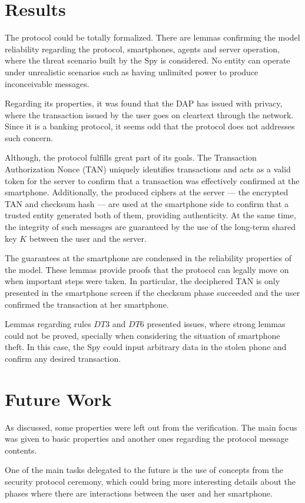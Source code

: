 \section{Results}
The protocol could be totally formalized. There are lemmas confirming the model reliability regarding the protocol, smartphones, agents and server operation, where the threat scenario built by the Spy is considered. No entity can operate under unrealistic scenarios such as having unlimited power to produce inconceivable messages.

Regarding its properties, it was found that the DAP has issued with privacy, where the transaction issued by the user goes on cleartext through the network. Since it is a banking protocol, it seems odd that the protocol does not addresses such concern.

Although, the protocol fulfills great part of its goals. The Transaction Authorization Nonce (TAN) uniquely identifies transactions and acts as a valid token for the server to confirm that a transaction was effectively confirmed at the smartphone. Additionally, the produced ciphers at the server --- the encrypted TAN and checksum hash --- are used at the smartphone side to confirm that a trusted entity generated both of them, providing authenticity. At the same time, the integrity of such messages are guaranteed by the use of the long-term shared key \(K\) between the user and the server.

The guarantees at the smartphone are condensed in the reliability properties of the model. These lemmas provide proofs that the protocol can legally move on when important steps were taken. In particular, the deciphered TAN is only presented in the smartphone screen if the checksum phase succeeded and the user confirmed the transaction at her smartphone.

Lemmas regarding rules $DT3$ and $DT6$ presented issues, where strong lemmas could not be proved, specially when considering the situation of smartphone theft. In this case, the Spy could input arbitrary data in the stolen phone and confirm any desired transaction.

\section{Future Work}
As discussed, some properties were left out from the verification. The main focus was given to basic properties and another ones regarding the protocol message contents.

One of the main tasks delegated to the future is the use of concepts from the security protocol ceremony, which could bring more interesting details about the phases where there are interactions between the user and her smartphone.

